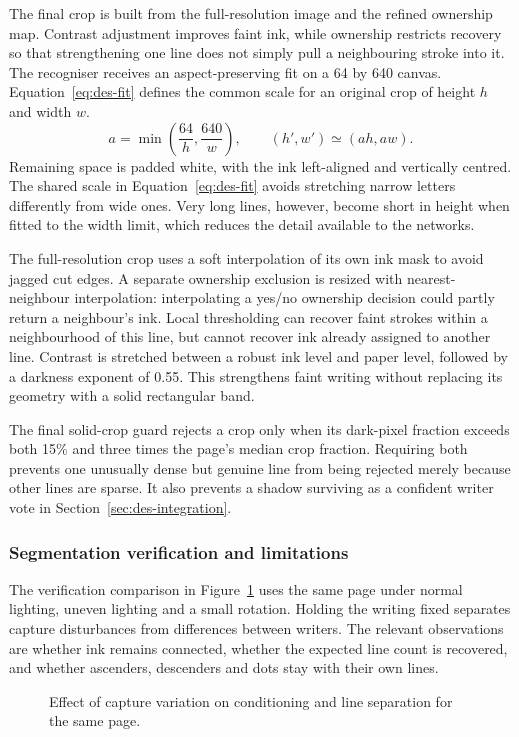 The final crop is built from the full-resolution image and the refined ownership map. Contrast adjustment improves faint ink, while ownership restricts recovery so that strengthening one line does not simply pull a neighbouring stroke into it. The recogniser receives an aspect-preserving fit on a 64 by 640 canvas. Equation~\ref{eq:des-fit} defines the common scale for an original crop of height $h$ and width $w$.
\begin{equation}
a=\min\left(\frac{64}{h},\frac{640}{w}\right),\qquad
(h',w')\simeq(ah,aw).
\label{eq:des-fit}
\end{equation}
Remaining space is padded white, with the ink left-aligned and vertically centred. The shared scale in Equation~\ref{eq:des-fit} avoids stretching narrow letters differently from wide ones. Very long lines, however, become short in height when fitted to the width limit, which reduces the detail available to the networks.

The full-resolution crop uses a soft interpolation of its own ink mask to avoid jagged cut edges. A separate ownership exclusion is resized with nearest-neighbour interpolation: interpolating a yes/no ownership decision could partly return a neighbour's ink. Local thresholding can recover faint strokes within a neighbourhood of this line, but cannot recover ink already assigned to another line. Contrast is stretched between a robust ink level and paper level, followed by a darkness exponent of 0.55. This strengthens faint writing without replacing its geometry with a solid rectangular band.

The final solid-crop guard rejects a crop only when its dark-pixel fraction exceeds both 15\% and three times the page's median crop fraction. Requiring both prevents one unusually dense but genuine line from being rejected merely because other lines are sparse. It also prevents a shadow surviving as a confident writer vote in Section~\ref{sec:des-integration}.

\subsubsection{Segmentation verification and limitations}
\label{sec:des-segverify}
The verification comparison in Figure~\ref{fig:des-seg-variation} uses the same page under normal lighting, uneven lighting and a small rotation. Holding the writing fixed separates capture disturbances from differences between writers. The relevant observations are whether ink remains connected, whether the expected line count is recovered, and whether ascenders, descenders and dots stay with their own lines.
\begin{figure}[!htbp]\centering
{}
\caption{Effect of capture variation on conditioning and line separation for the same page.}
\label{fig:des-seg-variation}
\end{figure}

